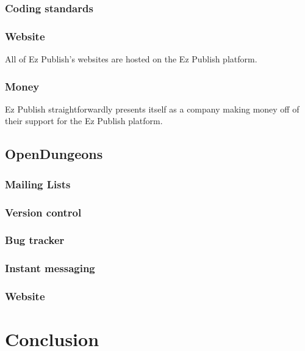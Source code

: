 \documentclass{report} %
\begin{document}
\subsubsection{Coding standards}
\subsubsection{Website}
All of Ez Publish's websites are hosted on the Ez Publish platform.
\subsubsection{Money}
Ez Publish straightforwardly presents itself as a company making money off of their support for the Ez Publish platform.

\subsection{OpenDungeons}
\subsubsection{Mailing Lists}
\subsubsection{Version control}
\subsubsection{Bug tracker}
\subsubsection{Instant messaging}
\subsubsection{Website}

\section{Conclusion}


\end{document}
